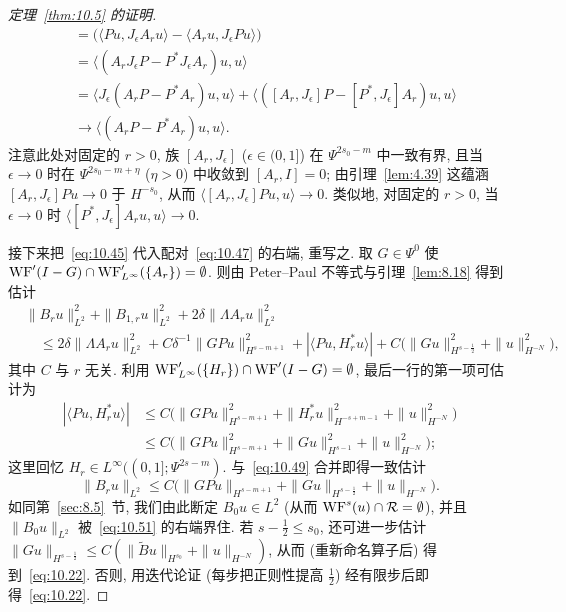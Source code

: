\begin{proof}[定理~\ref{thm:10.5} 的证明]
\begin{equation}
\begin{aligned}
        &= \bigl(\langle P u, J_\epsilon A_r u \rangle - \langle A_r u, J_\epsilon P u \rangle\bigr) \\
        &= \langle (A_r J_\epsilon P - P^* J_\epsilon A_r)u, u \rangle \\
        &= \langle J_\epsilon(A_r P - P^* A_r)u, u \rangle + \langle ([A_r, J_\epsilon]P - [P^*, J_\epsilon]A_r)u, u \rangle \\
        &\to \langle (A_r P - P^* A_r)u, u \rangle.
    \end{aligned}
\end{equation}
注意此处对固定的 $r > 0$, 族 $[A_r, J_\epsilon]$ ($\epsilon \in (0,1]$) 在 $\Psi^{2s_0-m}$ 中一致有界, 且当 $\epsilon \to 0$ 时在 $\Psi^{2s_0-m+\eta}$ ($\eta > 0$) 中收敛到 $[A_r, I] = 0$; 由引理~\ref{lem:4.39} 这蕴涵 $[A_r, J_\epsilon]P u \to 0$ 于 $H^{-s_0}$, 从而 $\langle [A_r, J_\epsilon]P u, u \rangle \to 0$. 类似地, 对固定的 $r > 0$, 当 $\epsilon \to 0$ 时 $\langle [P^*, J_\epsilon]A_r u, u \rangle \to 0$.

接下来把~\eqref{eq:10.45} 代入配对~\eqref{eq:10.47} 的右端, 重写之. 取 $G \in \Psi^0$ 使 $\operatorname{WF}'(I - G) \cap \operatorname{WF}_{L^\infty}'(\{A_r\}) = \emptyset$. 则由 Peter--Paul 不等式与引理~\ref{lem:8.18} 得到估计
\begin{equation}\label{eq:10.49}
    \begin{aligned}
        &\|B_r u\|_{L^2}^2 + \|B_{1,r} u\|_{L^2}^2 + 2\delta\|\Lambda A_r u\|_{L^2}^2 \\
        &\quad \le 2\delta\|\Lambda A_r u\|_{L^2}^2 + C\delta^{-1}\|G P u\|_{H^{s-m+1}}^2
        + |\langle P u, H_r^* u \rangle| + C\bigl(\|G u\|_{H^{s-\frac{1}{2}}}^2 + \|u\|_{H^{-N}}^2\bigr),
    \end{aligned}
\end{equation}
其中 $C$ 与 $r$ 无关. 利用 $\operatorname{WF}_{L^\infty}'(\{H_r\}) \cap \operatorname{WF}'(I - G) = \emptyset$, 最后一行的第一项可估计为
\begin{equation}\label{eq:10.50}
    \begin{aligned}
        |\langle P u, H_r^* u \rangle| &\le C\bigl(\|G P u\|_{H^{s-m+1}}^2 + \|H_r^* u\|_{H^{-s+m-1}}^2 + \|u\|_{H^{-N}}^2\bigr) \\
        &\le C\bigl(\|G P u\|_{H^{s-m+1}}^2 + \|G u\|_{H^{s-1}}^2 + \|u\|_{H^{-N}}^2\bigr);
    \end{aligned}
\end{equation}
这里回忆 $H_r \in L^\infty((0,1]; \Psi^{2s-m})$. 与~\eqref{eq:10.49} 合并即得一致估计
\begin{equation}\label{eq:10.51}
    \|B_r u\|_{L^2} \le C\bigl(\|G P u\|_{H^{s-m+1}} + \|G u\|_{H^{s-\frac{1}{2}}} + \|u\|_{H^{-N}}\bigr).
\end{equation}
如同第~\ref{sec:8.5}~节, 我们由此断定 $B_0 u \in L^2$ (从而 $\operatorname{WF}^s(u) \cap \mathcal{R} = \emptyset$), 并且 $\|B_0 u\|_{L^2}$ 被~\eqref{eq:10.51} 的右端界住. 若 $s - \frac{1}{2} \le s_0$, 还可进一步估计 $\|G u\|_{H^{s-\frac{1}{2}}} \le C(\|\tilde{B}u\|_{H^{s_0}} + \|u\|_{H^{-N}})$, 从而 (重新命名算子后) 得到~\eqref{eq:10.22}. 否则, 用迭代论证 (每步把正则性提高 $\frac{1}{2}$) 经有限步后即得~\eqref{eq:10.22}.


\end{proof}
